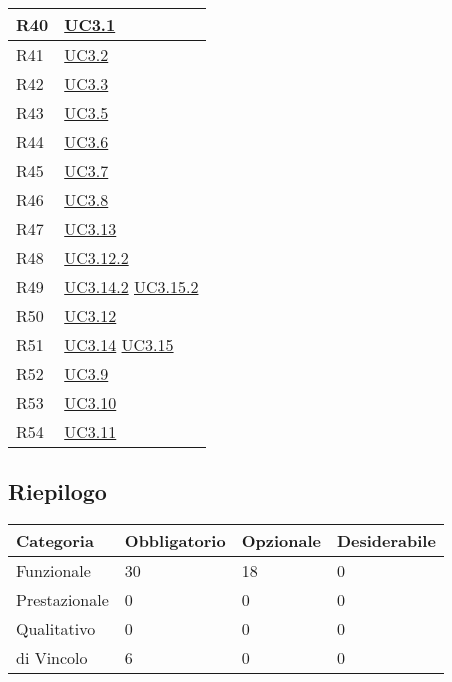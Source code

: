 \begin{longtable}{|P{6cm}|P{6cm}|}
	\hline R40 & \hyperref[UC3.1]{UC3.1} \\
	\hline R41 & \hyperref[UC3.2]{UC3.2} \\
	\hline R42 & \hyperref[UC3.3]{UC3.3} \\
	\hline R43 & \hyperref[UC3.5]{UC3.5} \\
	\hline R44 & \hyperref[UC3.6]{UC3.6} \\
	\hline R45 & \hyperref[UC3.7]{UC3.7} \\
	\hline R46 & \hyperref[UC3.8]{UC3.8} \\
	\hline R47 & \hyperref[UC3.13]{UC3.13} \\
	\hline R48 & \hyperref[UC3.12.2]{UC3.12.2} \\
	\hline R49 & \hyperref[UC3.14.2]{UC3.14.2} \linebreak \hyperref[UC3.15.2]{UC3.15.2} \\
	\hline R50 & \hyperref[UC3.12]{UC3.12} \\
	\hline R51 & \hyperref[UC3.14]{UC3.14} \linebreak \hyperref[UC3.15]{UC3.15} \\
	\hline R52 & \hyperref[UC3.9]{UC3.9} \\
	\hline R53 & \hyperref[UC3.10]{UC3.10} \\
	\hline R54 & \hyperref[UC3.11]{UC3.11} \\	
	\hline
\end{longtable}

\subsection{Riepilogo}

\begin{longtable}{|P{3cm}|P{3cm}|P{3cm}|P{3cm}|}
	\hline \textbf{Categoria} & \textbf{Obbligatorio} & \textbf{Opzionale} & \textbf{Desiderabile} \\
	\hline Funzionale & 30 & 18 & 0 \\
	\hline Prestazionale & 0 & 0 & 0 \\
	\hline Qualitativo & 0 & 0 & 0 \\
	\hline di Vincolo & 6 & 0 & 0 \\
	\hline
\end{longtable}
